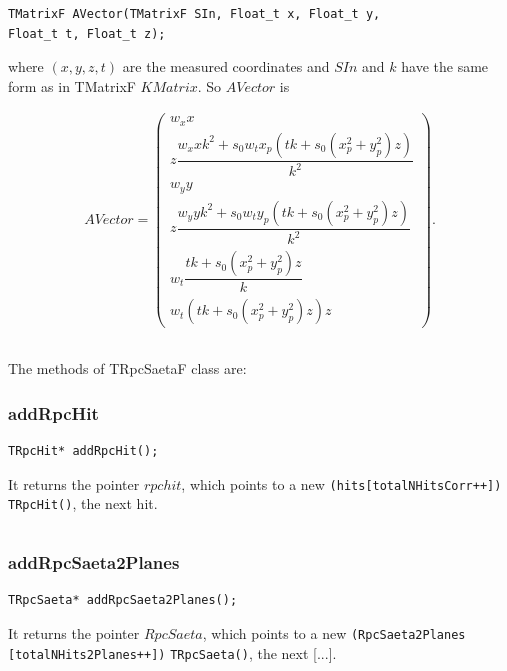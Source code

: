 \documentclass[a4paper]{book}
\begin{document}
\begin{itemize}
	\begin{lstlisting}
TMatrixF AVector(TMatrixF SIn, Float_t x, Float_t y, 
Float_t t, Float_t z);
	\end{lstlisting}
	
	where $(x, y, z, t)$ are the measured coordinates and $SIn$ and $k$ have the same form as in TMatrixF $KMatrix$. So $AVector$ is
	
	\begin{align*}
	AVector = \left(
	\begin{array}{c}
	w_x x\\
	z \dfrac{w_x x k^2 + s_0 w_t x_p (t k+ s_0 (x_p^2 +y_p^2 )z)}{k^2}\\
	w_y y\\
	z \dfrac{w_y y k^2 + s_0 w_t y_p (t k+ s_0 (x_p^2 +y_p^2 )z)}{k^2}\\
	w_t \dfrac{t k + s_0 (x_p^2+ y_p^2)z}{k}\\
	w_t (t k + s_0 (x_p^2+ y_p^2)z) z
	\end{array} \right).
	\end{align*}
	
	
\end{itemize}

\[\]

The methods of TRpcSaetaF class are:

\subsubsection{addRpcHit}

\begin{lstlisting}
TRpcHit* addRpcHit();
\end{lstlisting}

It returns the pointer $rpchit$, which points to a new \texttt{(hits[totalNHitsCorr++]) TRpcHit()}, the next hit.

\[\]

\subsubsection{addRpcSaeta2Planes}

\begin{lstlisting}
TRpcSaeta* addRpcSaeta2Planes();
\end{lstlisting}

It returns the pointer $RpcSaeta$, which points to a new \texttt{(RpcSaeta2Planes} \texttt{[totalNHits2Planes++])} \texttt{TRpcSaeta()}, the next [...].

\[\]
\end{document}
